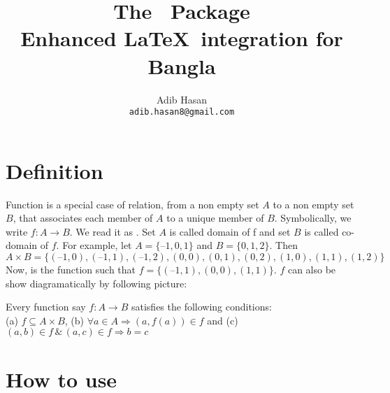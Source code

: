 \documentclass[11pt]{article}
\title{The \latexbangla~Package\\
Enhanced \LaTeX\ integration for Bangla}
\author{Adib Hasan\\
\texttt{adib.hasan8@gmail.com}}
\date{\filedate\qquad\fileversion}
\theoremstyle{custom}
\begin{document}
\maketitle
\tableofcontents
\pagebreak
\section{Definition}
Function is a special case of relation, from a non empty set $A$ to a non empty set $B$, that associates each member of $A$ to a unique member of $B$. Symbolically, we write $f: A \rightarrow B$. We read it as .
Set $A$ is called domain of f and set $B$ is called co-domain of $f$.
For example, let $A = \{–1, 0, 1\}$ and $B=\{0, 1, 2\}$. Then $A\times B = \{(–1, 0), (–1, 1), (–1, 2), (0, 0), (0, 1), (0, 2), (1, 0),(1, 1), (1, 2)\}$
Now,  is the function such that $f = \{(–1, 1), (0, 0), (1, 1)\}$. $f$ can also be show diagramatically by following picture:

\begin{figure}[h]
 \centering
\end{figure}

Every function say $f : A \rightarrow B$ satisfies the following conditions:\\
(a) $f \subseteq A\times B$, (b) $\forall a\in A \Rightarrow (a, f(a)) \in f$ and (c) $(a, b)\in f\, \&\, (a, c) \in f \Rightarrow b = c$
\section{How to use}
\end{document}
